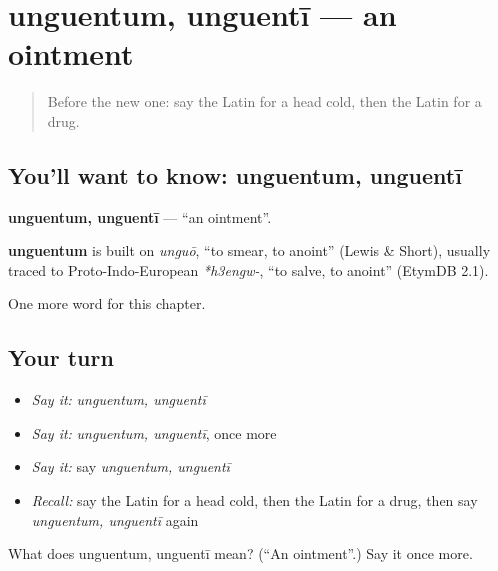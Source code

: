 \section[unguentum, unguentī]{unguentum, unguentī — an ointment}

\label{lesson:LA-C205-unguentum}



\begin{quote}
Before the new one: say the Latin for a head cold, then the Latin for a drug.
\end{quote}

\subsection*{You'll want to know: unguentum, unguentī}
\textbf{unguentum, unguentī} — \textquotedblleft{}an ointment\textquotedblright{}.

\begin{cousinweb}
\textbf{unguentum} is built on \emph{unguō}, \textquotedblleft{}to smear, to anoint\textquotedblright{} (Lewis \& Short), usually traced to Proto-Indo-European \emph{*h3engw-}, \textquotedblleft{}to salve, to anoint\textquotedblright{} (EtymDB 2.1).
\end{cousinweb}

\begin{grammarlens}[title={What you've built}]
One more word for this chapter.
\end{grammarlens}

\subsection*{Your turn}
\begin{itemize}
\raggedright
  \item \emph{Say it:} \emph{unguentum, unguentī}
  \item \emph{Say it:} \emph{unguentum, unguentī}, once more
  \item \emph{Say it:} say \emph{unguentum, unguentī}
  \item \emph{Recall:} say the Latin for a head cold, then the Latin for a drug, then say \emph{unguentum, unguentī} again
\end{itemize}

\begin{tcolorbox}[breakable,colback=teal!4,colframe=teal!35!black,title={Before you move on}]
What does unguentum, unguentī mean? (\textquotedblleft{}An ointment\textquotedblright{}.) Say it once more.
\end{tcolorbox}
